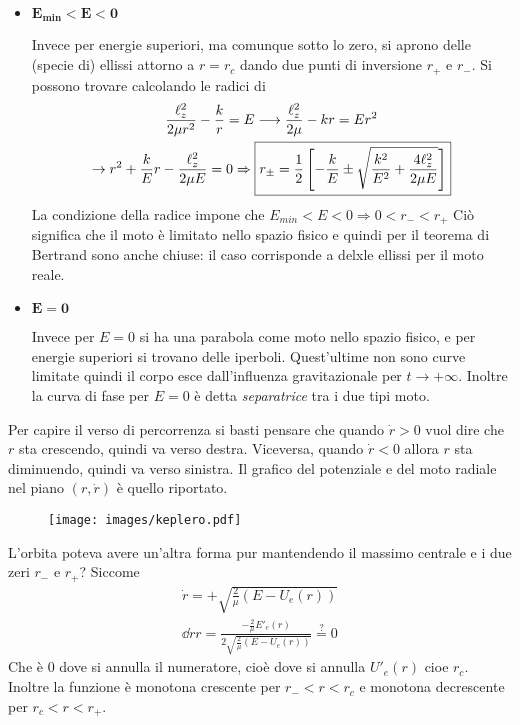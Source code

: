 \documentclass[Main.tex]{subfiles}
\begin{document}
\begin{tema}
\begin{itemize}
\item $\mathbf{E_{min}<E<0}$

Invece per energie superiori, ma comunque sotto lo zero, si aprono delle (specie di) ellissi attorno a $r=r_c$ dando due punti di inversione $r_+$ e $r_-$. Si possono trovare calcolando le radici di 
\begin{gather}
	\frac{\ell_z^2}{2 \mu r^2}- \frac{k}{r} =E \longrightarrow \frac{\ell_z^2}{2\mu} - kr = Er^2 \\
	\rightarrow r^2 + \frac{k}{E}r - \frac{\ell_z^2}{2 \mu E}=0 \Rightarrow \boxed{r_\pm = \frac{1}{2} \left[ - \frac{k}{E} \pm \sqrt{\frac{k^2}{E^2} + \frac{4 \ell_z^2}{2 \mu E}} \right]} \notag
\end{gather} 
La condizione della radice impone che $E_{min}<E<0 \Rightarrow 0<r_- <r_+$
Ciò significa che il moto è limitato nello spazio fisico e quindi per il teorema di Bertrand sono anche chiuse: il caso corrisponde a delxle ellissi per il moto reale. 


\item $\mathbf{E=0}$

Invece per $E=0$ si ha una parabola come moto nello spazio fisico, e per energie superiori si trovano delle iperboli. Quest'ultime non sono curve limitate quindi il corpo esce dall'influenza gravitazionale per $t \rightarrow +\infty$. Inoltre la curva di fase per $E=0$ è detta \emph{separatrice} tra i due tipi moto. 
\end{itemize}
Per capire il verso di percorrenza si basti pensare che quando $\dot r>0$ vuol dire che $r$ sta crescendo, quindi va verso destra. Viceversa, quando $\dot r<0$ allora $r$ sta diminuendo, quindi va verso sinistra. Il grafico del potenziale e del moto radiale nel piano $(r, \dot r)$ è quello riportato.

\begin{figure}[H]
	\centering 	
	\hspace{80pt} \texttt{[image: images/keplero.pdf]}{}
\end{figure}



\begin{osservazioni}
	\item L'orbita poteva avere un'altra forma pur mantendendo il massimo centrale e i due zeri $r_-$ e $r_+$? Siccome 
	\begin{gather}
		\dot r = + \sqrt{\frac{2}{\mu} (E-U_e(r))}\\
		\dd{\dot r}{r} = \frac{-\frac{2}{\mu} E'_e(r)}{2 \sqrt{\frac{2}{\mu} (E-U_e(r))}}\overset{?}{=}0
	\end{gather}
	Che è $0$ dove si annulla il numeratore, cioè dove si annulla $U'_e(r)$ cioe $r_c$. Inoltre la funzione è monotona crescente per $r_-<r<r_c$ e monotona decrescente per $r_c<r<r_+$. 
	

\end{osservazioni}
\end{tema}
\end{document}
